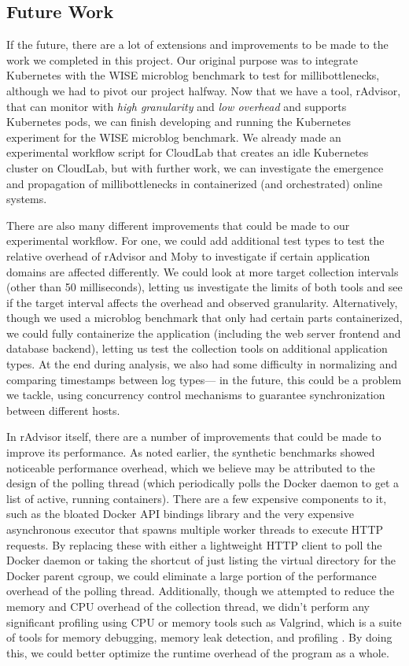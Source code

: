 \documentclass[a4paper,11pt]{article}
\newcommand{\granularity}{\textit{high granularity}\xspace}
\newcommand{\overhead}{\textit{low overhead}\xspace}
\begin{document}
\subsection{Future Work}

If the future, there are a lot of extensions and improvements to be made to the work we completed in this project.
Our original purpose was to integrate Kubernetes with the WISE microblog benchmark to test for millibottlenecks,
although we had to pivot our project halfway. 
Now that we have a tool, rAdvisor, that can monitor with \granularity and \overhead and supports Kubernetes pods,
we can finish developing and running the Kubernetes experiment for the WISE microblog benchmark.
We already made an experimental workflow script for CloudLab that creates an idle Kubernetes cluster on CloudLab,
but with further work, we can investigate the emergence and propagation of millibottlenecks
in containerized (and orchestrated) online systems.

There are also many different improvements that could be made to our experimental workflow.
For one, we could add additional test types to test the relative overhead of rAdvisor and Moby
to investigate if certain application domains are affected differently.
We could look at more target collection intervals (other than 50 milliseconds),
letting us investigate the limits of both tools and see if the target interval affects the overhead and observed granularity.
Alternatively, though we used a microblog benchmark that only had certain parts containerized,
we could fully containerize the application (including the web server frontend and database backend),
letting us test the collection tools on additional application types.
At the end during analysis, we also had some difficulty in normalizing and comparing timestamps between log types---%
in the future, this could be a problem we tackle,
using concurrency control mechanisms to guarantee synchronization between different hosts.

In rAdvisor itself, there are a number of improvements that could be made to improve its performance.
As noted earlier, the synthetic benchmarks showed noticeable performance overhead,
which we believe may be attributed to the design of the polling thread
(which periodically polls the Docker daemon to get a list of active, running containers).
There are a few expensive components to it, such as the bloated Docker API bindings library
and the very expensive asynchronous executor that spawns multiple worker threads to execute HTTP requests.
By replacing these with either a lightweight HTTP client to poll the Docker daemon
or taking the shortcut of just listing the virtual directory for the Docker parent cgroup,
we could eliminate a large portion of the performance overhead of the polling thread.
Additionally, though we attempted to reduce the memory and CPU overhead of the collection thread,
we didn't perform any significant profiling using CPU or memory tools such as Valgrind,
which is a suite of tools for memory debugging, memory leak detection, and profiling \cite{Valgrind}.
By doing this, we could better optimize the runtime overhead of the program as a whole.
\end{document}
